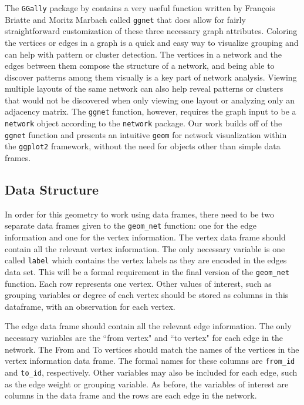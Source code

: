 \documentclass[11pt]{article}\usepackage[]{graphicx}\usepackage[]{color}
\begin{document}
\par The \texttt{GGally} package by \citet{ggally} contains a very useful function written by Fran\c{c}ois Briatte and Moritz Marbach called \texttt{ggnet} that does allow for fairly straightforward customization of these three necessary graph attributes.
Coloring the vertices or edges in a graph is a quick and easy way to visualize grouping and can help with pattern or cluster detection. The vertices in a network and the edges between them compose the structure of a network, and being able to discover patterns among them visually is a key part of network analysis. Viewing multiple layouts of the same network can also help reveal patterns or clusters that would not be discovered when only viewing one layout or analyzing only an adjacency matrix. The \texttt{ggnet} function, however, requires the graph input to be a \texttt{network} object according to the \texttt{network} package.  Our work builds off of the \texttt{ggnet} function and presents an intuitive \texttt{geom} for network visualization within the \texttt{ggplot2} framework, without the need for objects other than simple data frames.

  \subsection{Data Structure}
In order for this geometry to work using data frames, there need to be two separate data frames given to the \texttt{geom\_net} function: one for the edge information and one for the vertex information. The vertex data frame should contain all the relevant vertex information. The only necessary variable is one called \texttt{label} which contains the vertex labels as they are encoded in the edges data set. This will be a formal requirement in the final version of the \texttt{geom\_net} function.  Each row represents one vertex.  Other values of interest, such as grouping variables or degree of each vertex should be stored as columns in this dataframe, with an observation for each vertex.
  \par The edge data frame should contain all the relevant edge information. The only necessary variables are the ``from vertex" and ``to vertex" for each edge in the network. The From and To vertices should match the names of the vertices in the vertex information data frame. The formal names for these columns are \texttt{from\_id} and \texttt{to\_id}, respectively.  Other variables may also be included for each edge, such as the edge weight or grouping variable.  As before, the variables of interest are columns in the data frame and the rows are each edge in the network.
\end{document}
